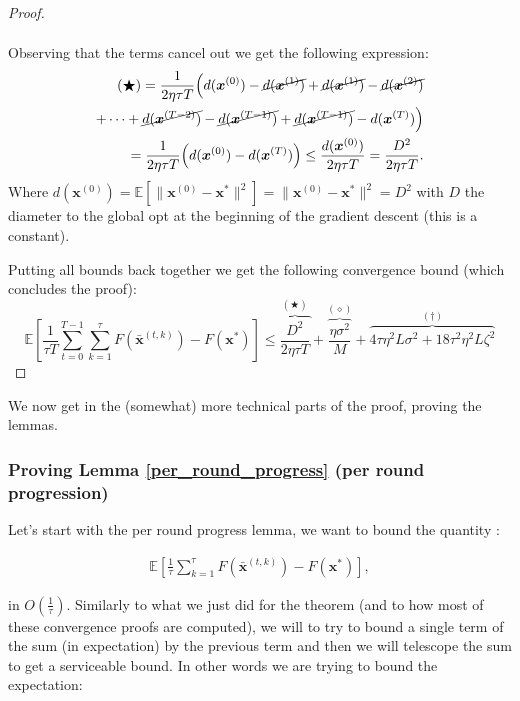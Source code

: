 \begin{proof}
\begin{enumerate}
\begin{align*}
        \end{align*}
        Observing that the terms cancel out we get the following expression: 
        \begin{align*}
        (\bigstar)= \frac{1}{2 \eta \tau T} \Big( d(\bm{x}^{(0)}) - \cancel{d(\bm{x}^{(1)})} +  \cancel{ d(\bm{x}^{(1)})} - \cancel{d(\bm{x}^{(2)})}  \\
        + \cdots + \cancel{ d(\bm{x}^{(T-2)}) } - \cancel{ d(\bm{x}^{(T-1)}) } + \cancel{ d(\bm{x}^{(T-1)}) } -  d(\bm{x}^{(T)}) \Big) \\= \frac{1}{2 \eta \tau T} \Big( d(\bm{x}^{(0)})  -  d(\bm{x}^{(T)}) \Big) \leq \frac{d(\bm{x}^{(0)})}{2 \eta \tau T} = \frac{D^2}{2 \eta \tau T} .
        \end{align*}
        Where $d(\bm{x}^{(0)}) = \mathbb{E}[\| \bm{x}^{(0)} -\bm{x}^* \|^2] = \| \bm{x}^{(0)} -\bm{x}^* \|^2 = D^2$ with $D$ the diameter to the global opt at the beginning of the gradient descent (this is a constant).
    \end{enumerate}
    Putting all bounds back together we get the following convergence bound (which concludes the proof):
    \[\mathbb{E} \left[ \frac{1}{\tau T} \sum_{t=0}^{T-1}\sum_{k=1}^{\tau} F(\bar{\bm{x}}^{(t,k)}) - F(\bm{x}^*)\right] 
    \leq \overbrace{\frac{D^2}{2 \eta \tau T} }^{(\bigstar)}+\overbrace{ \frac{\eta \sigma^2}{M}}^{(\diamond)} + \overbrace{4 \tau \eta^2 L \sigma^2 + 18 \tau^2 \eta^2 L \zeta^2}^{(\dagger)} \]
    
\end{proof}

We now get in the (somewhat) more technical parts of the proof, proving the lemmas. 

\subsubsection*{Proving Lemma \ref{per_round_progress} (per round progression)}

Let's start with the per round progress lemma, we want to bound the quantity : 

\begin{align*}
    \mathbb{E} \left[ \frac{1}{\tau} \sum_{k=1}^{\tau} F(\bar{\bm{x}}^{(t,k)}) - F(\bm{x}^*)\right],
\end{align*}

in $O(\frac{1}{\tau})$. Similarly to what we just did for the theorem (and to how most of these convergence proofs are computed), we will to try to bound a single term of the sum (in expectation) by the previous term and then we will telescope the sum to get a serviceable bound. In other words we are trying to bound the expectation:

